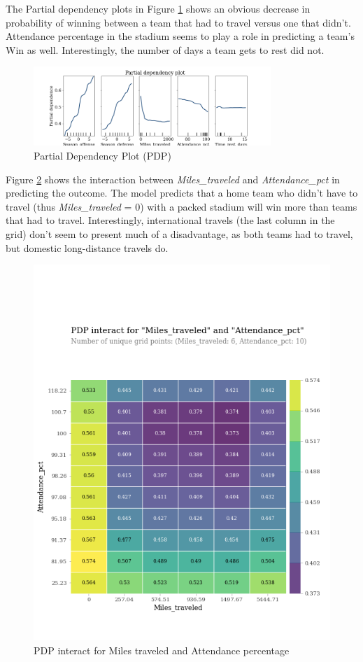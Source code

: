 \documentclass[12pt, letterpaper, twoside]{article}
\begin{document}
The Partial dependency plots in Figure \ref{fig:pdp} shows an obvious decrease in probability of winning between a team that had to travel versus one that didn't. Attendance percentage in the stadium seems to play a role in predicting a team's Win as well. Interestingly, the number of days a team gets to rest did not. 

\begin{figure}[H]%
	\centering
   \includegraphics[width=0.8\textwidth]{../09_figures/plot_pdp.png} 
    \caption{Partial Dependency Plot (PDP)}
    \label{fig:pdp}%
\end{figure}

Figure \ref{fig:hainter} shows the interaction between \textit{Miles\_traveled} and \textit{Attendance\_pct} in predicting the outcome. The model predicts that a home team who didn't have to travel (thus \textit{Miles\_traveled} = 0) with a packed stadium will win more than teams that had to travel. Interestingly, international travels (the last column in the grid) don't seem to present much of a disadvantage, as both teams had to travel, but domestic long-distance travels do.
\begin{figure}[H]%
	\centering
   \includegraphics[width=0.5\linewidth]{../09_figures/home_attendance.png} 
    \caption{PDP interact for Miles traveled and Attendance percentage}
    \label{fig:hainter}%
\end{figure}
\end{document}
